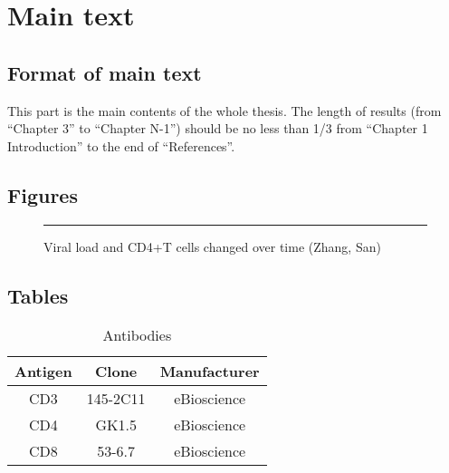 \documentclass[degree=doctor, language=english, format=medical]{thuthesis}
\begin{document}
\START
\showoutput

\copyrightpage


\frontmatter

\tableofcontents

\listoffigures

\listoftables


\mainmatter

\chapter{Main text}

\section{Format of main text}

This part is the main contents of the whole thesis. The length of results (from “Chapter 3” to “Chapter N-1”) should be no less than 1/3 from “Chapter 1 Introduction” to the end of ``References''.


\section{Figures}

\begin{figure}[htb]
  \centering
  \rule{1cm}{1cm}
  \caption{Viral load and CD4+T cells changed over time (Zhang, San)}
\end{figure}


\section{Tables}

\begin{table}[htb]
  \centering
  \caption{Antibodies}
  \begin{tabular}{ccc}
    \toprule
    Antigen & Clone    & Manufacturer \\
    \midrule
    CD3     & 145-2C11 & eBioscience \\
    CD4     & GK1.5    & eBioscience \\
    CD8     & 53-6.7   & eBioscience \\
    \bottomrule
  \end{tabular}
\end{table}


\backmatter

\statement


\clearpage
\OMIT
\end{document}
